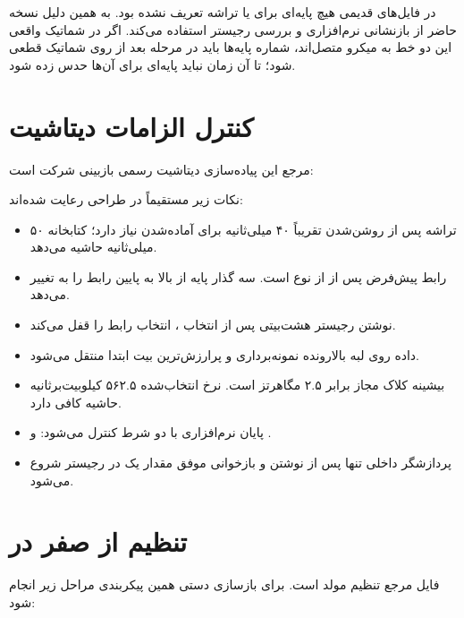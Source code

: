در فایل‌های قدیمی هیچ پایه‌ای برای
یا
تراشه تعریف نشده بود. به همین دلیل نسخه حاضر از بازنشانی نرم‌افزاری و بررسی رجیستر
استفاده می‌کند. اگر در شماتیک واقعی این دو خط به میکرو متصل‌اند، شماره پایه‌ها باید در مرحله بعد از روی شماتیک قطعی شود؛ تا آن زمان نباید پایه‌ای برای آن‌ها حدس زده شود.

\section{کنترل الزامات دیتاشیت}
مرجع این پیاده‌سازی دیتاشیت رسمی بازبینی
شرکت
است:
\href{https://www.analog.com/media/en/technical-documentation/data-sheets/ADE7880.pdf}{}

نکات زیر مستقیماً در طراحی رعایت شده‌اند:

\begin{itemize}
  \item تراشه پس از روشن‌شدن تقریباً ۴۰ میلی‌ثانیه برای آماده‌شدن نیاز دارد؛ کتابخانه ۵۰ میلی‌ثانیه حاشیه می‌دهد.
  \item رابط پیش‌فرض پس از  از نوع  است. سه گذار پایه  از بالا به پایین رابط را به  تغییر می‌دهد.
  \item نوشتن رجیستر هشت‌بیتی  پس از انتخاب ، انتخاب رابط را قفل می‌کند.
  \item داده روی لبه بالارونده  نمونه‌برداری و پرارزش‌ترین بیت ابتدا منتقل می‌شود.
  \item بیشینه کلاک مجاز  برابر ۲.۵ مگاهرتز است. نرخ انتخاب‌شده ۵۶۲.۵ کیلوبیت‌برثانیه حاشیه کافی دارد.
  \item پایان  نرم‌افزاری با دو شرط کنترل می‌شود:  و .
  \item پردازشگر داخلی تنها پس از نوشتن و بازخوانی موفق مقدار یک در رجیستر  شروع می‌شود.
\end{itemize}

\section{تنظیم از صفر در }
فایل
مرجع تنظیم مولد است. برای بازسازی دستی همین پیکربندی مراحل زیر انجام شود:

